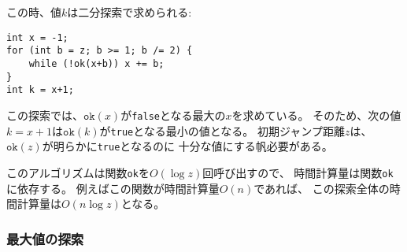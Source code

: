この時、値$k$は二分探索で求められる:

\begin{lstlisting}
int x = -1;
for (int b = z; b >= 1; b /= 2) {
    while (!ok(x+b)) x += b;
}
int k = x+1;
\end{lstlisting}

\begin{comment}
The search finds the largest value of $x$ for which
$\texttt{ok}(x)$ is \texttt{false}.
Thus, the next value $k=x+1$
is the smallest possible value for which
$\texttt{ok}(k)$ is \texttt{true}.
The initial jump length $z$ has to be
large enough, for example some value
for which we know beforehand that $\texttt{ok}(z)$ is \texttt{true}.

The algorithm calls the function \texttt{ok}
$O(\log z)$ times, so the total time complexity
depends on the function \texttt{ok}.
For example, if the function works in $O(n)$ time,
\end{comment}

この探索では、$\texttt{ok}(x)$が\texttt{false}となる最大の$x$を求めている。
そのため、次の値$k=x+1$は$\texttt{ok}(k)$が\texttt{true}となる最小の値となる。
初期ジャンプ距離$z$は、 $\texttt{ok}(z)$が明らかに\texttt{true}となるのに
十分な値にする帆必要がある。

このアルゴリズムは関数\texttt{ok}を$O(\log z)$回呼び出すので、
時間計算量は関数\texttt{ok}に依存する。
例えばこの関数が時間計算量$O(n)$であれば、
この探索全体の時間計算量は$O(n \log z)$となる。

\begin{comment}
\subsubsection{Finding the maximum value}

Binary search can also be used to find
the maximum value for a function that is
first increasing and then decreasing.
Our task is to find a position $k$ such that
\begin{itemize}
\item
$f(x)<f(x+1)$ when $x<k$, and
\item
$f(x)>f(x+1)$ when $x \ge k$.
\end{itemize}
\end{comment}

\subsubsection{最大値の探索}

